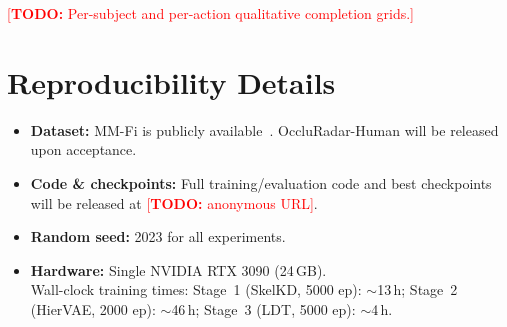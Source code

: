\documentclass{article}
\newcommand{\todo}[1]{\textcolor{red}{[\textbf{TODO:} #1]}}
\begin{document}
\todo{Per-subject and per-action qualitative completion grids.}

\section{Reproducibility Details}
\label{app:repro}

\begin{itemize}[leftmargin=1.5em,itemsep=2pt]
  \item \textbf{Dataset:} MM-Fi is publicly available~\cite{yang2023mmfi}.
        OccluRadar-Human will be released upon acceptance.
  \item \textbf{Code \& checkpoints:} Full training/evaluation code and best
        checkpoints will be released at \todo{anonymous URL}.
  \item \textbf{Random seed:} 2023 for all experiments.
  \item \textbf{Hardware:} Single NVIDIA RTX 3090 (24\,GB).\\
        Wall-clock training times:
        Stage~1 (SkelKD, 5000 ep): $\sim$13\,h;\;
        Stage~2 (HierVAE, 2000 ep): $\sim$46\,h;\;
        Stage~3 (LDT, 5000 ep): $\sim$4\,h.
\end{itemize}
\end{document}
